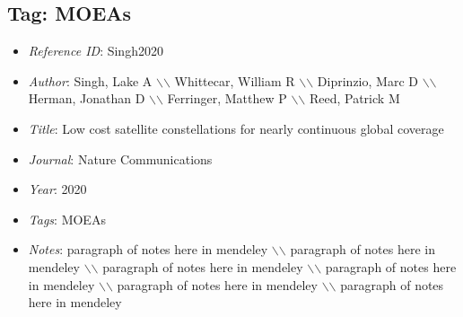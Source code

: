 \documentclass[11pt]{article}
\begin{document}
\subsection{Tag: MOEAs} 
\noindent\citep{Singh2020} 
\begin{itemize} 
\item{\textit{Reference ID}:  Singh2020} 

\item{\textit{Author}:  Singh, Lake A $\backslash$$\backslash$ Whittecar, William R $\backslash$$\backslash$ Diprinzio, Marc D $\backslash$$\backslash$ Herman, Jonathan D $\backslash$$\backslash$ Ferringer, Matthew P $\backslash$$\backslash$ Reed, Patrick M} 

\item{\textit{Title}:  Low cost satellite constellations for nearly continuous global coverage} 

\item{\textit{Journal}:  Nature Communications} 

\item{\textit{Year}:  2020} 

\item{\textit{Tags}:  MOEAs} 

\item{\textit{Notes}:  paragraph of notes here in mendeley $\backslash$$\backslash$ paragraph of notes here in mendeley $\backslash$$\backslash$ paragraph of notes here in mendeley $\backslash$$\backslash$ paragraph of notes here in mendeley $\backslash$$\backslash$ paragraph of notes here in mendeley $\backslash$$\backslash$ paragraph of notes here in mendeley} 

\end{itemize}\medskip
\end{document}
